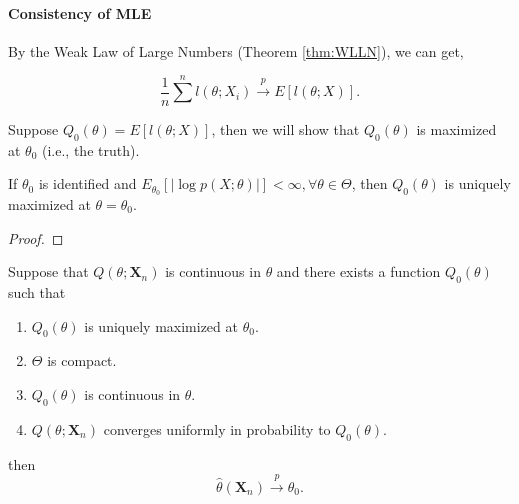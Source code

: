\paragraph{Consistency of MLE}

By the Weak Law of Large Numbers (Theorem \ref{thm:WLLN}), we can get,

\begin{equation}
    \frac{1}{n}\sum^{n}l\left(\theta;X_{i}\right)\stackrel{p}{\rightarrow}E\left[l(\theta;X)\right].
\end{equation}

Suppose $Q_{0}(\theta)=E\left[l(\theta;X)\right]$, then we will show that $Q_{0}(\theta)$ is maximized at $\theta_{0}$ (i.e., the truth).

\begin{lemma}
    If $\theta_{0}$ is identified and $E_{\theta_{0}}\left[|\log p(X;\theta)|\right]<\infty,\forall\theta\in\Theta$, then $Q_{0}(\theta)$ is uniquely maximized at $\theta=\theta_{0}$.
\end{lemma}

\begin{proof}

\end{proof}

\begin{theorem}
    Suppose that $Q\left(\theta;\textbf{X}_{n}\right)$ is continuous in $\theta$ and there exists a function $Q_{0}(\theta)$ such that
    \begin{enumerate}
        \item $Q_{0}(\theta)$ is uniquely maximized at $\theta_{0}$.
        \item $\Theta$ is compact.
        \item $Q_{0}(\theta)$ is continuous in $\theta$.
        \item $Q\left(\theta;\textbf{X}_{n}\right)$ converges uniformly in probability to $Q_{0}(\theta)$.
    \end{enumerate}
    then
    \begin{equation}
        \hat{\theta}\left(\textbf{X}_{n}\right)\stackrel{p}{\rightarrow}\theta_{0}.
    \end{equation}
\end{theorem}

